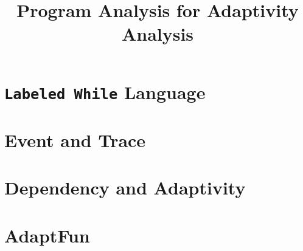 \documentclass[a4paper,11pt]{article}
\newcommand{\highlight}[1]{\textcolor[rgb]{.0,0.0,1.0}{ #1}}
\newcommand{\THESYSTEM}{\textsf{AdaptFun}}
\begin{document}
\title{Program Analysis for Adaptivity Analysis}

\author{}

\date{}

\maketitle
%
\tableofcontents

% 
\section{{\tt Labeled While} Language}

\clearpage
\section{Event and Trace}


\clearpage
\section{\highlight{Dependency and Adaptivity}}


% 
\clearpage
\section{\THESYSTEM}
\label{sec:adpfun}





\clearpage
%
\end{document}
